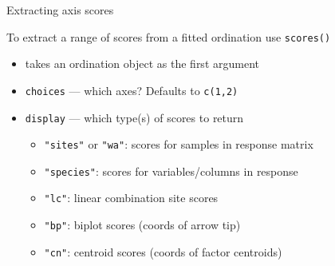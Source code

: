 \documentclass[10pt,ignorenonframetext,compress, aspectratio=169]{beamer}
\providecommand{\tightlist}{%
  \setlength{\itemsep}{0pt}\setlength{\parskip}{0pt}}
\begin{document}
\begin{frame}[fragile]{Extracting axis scores}

To extract a range of scores from a fitted ordination use
\texttt{scores()}

\begin{itemize}
\tightlist
\item
  takes an ordination object as the first argument
\item
  \texttt{choices} --- which axes? Defaults to \texttt{c(1,2)}
\item
  \texttt{display} --- which type(s) of scores to return

  \begin{itemize}
  \tightlist
  \item
    \texttt{"sites"} or \texttt{"wa"}: scores for samples in response
    matrix
  \item
    \texttt{"species"}: scores for variables/columns in response
  \item
    \texttt{"lc"}: linear combination site scores
  \item
    \texttt{"bp"}: biplot scores (coords of arrow tip)
  \item
    \texttt{"cn"}: centroid scores (coords of factor centroids)
  \end{itemize}
\end{itemize}

\end{frame}
\end{document}
